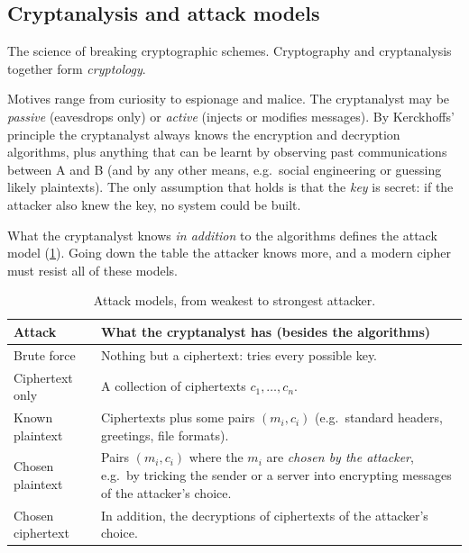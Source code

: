\subsection{Cryptanalysis and attack models}

\begin{definition}[Cryptanalysis]
The science of breaking cryptographic schemes. Cryptography and cryptanalysis together form \emph{cryptology}.
\end{definition}

Motives range from curiosity to espionage and malice. The cryptanalyst may be \emph{passive} (eavesdrops only) or \emph{active} (injects or modifies messages). By Kerckhoffs' principle the cryptanalyst always knows the encryption and decryption algorithms, plus anything that can be learnt by observing past communications between A and B (and by any other means, e.g.\ social engineering or guessing likely plaintexts). The only assumption that holds is that the \emph{key} is secret: if the attacker also knew the key, no system could be built.

What the cryptanalyst knows \emph{in addition} to the algorithms defines the attack model (\cref{tab:attack-models}). Going down the table the attacker knows more, and a modern cipher must resist all of these models.

\begin{table}[H]
\centering
\caption{Attack models, from weakest to strongest attacker.}
\label{tab:attack-models}
\begin{tabularx}{\textwidth}{@{}l X@{}}
\toprule
Attack & What the cryptanalyst has (besides the algorithms) \\
\midrule
Brute force & Nothing but a ciphertext: tries every possible key. \\
Ciphertext only & A collection of ciphertexts $c_1, \dots, c_n$. \\
Known plaintext & Ciphertexts plus some pairs $(m_i, c_i)$ (e.g.\ standard headers, greetings, file formats). \\
Chosen plaintext & Pairs $(m_i, c_i)$ where the $m_i$ are \emph{chosen by the attacker}, e.g.\ by tricking the sender or a server into encrypting messages of the attacker's choice. \\
Chosen ciphertext & In addition, the decryptions of ciphertexts of the attacker's choice. \\
\bottomrule
\end{tabularx}
\end{table}

